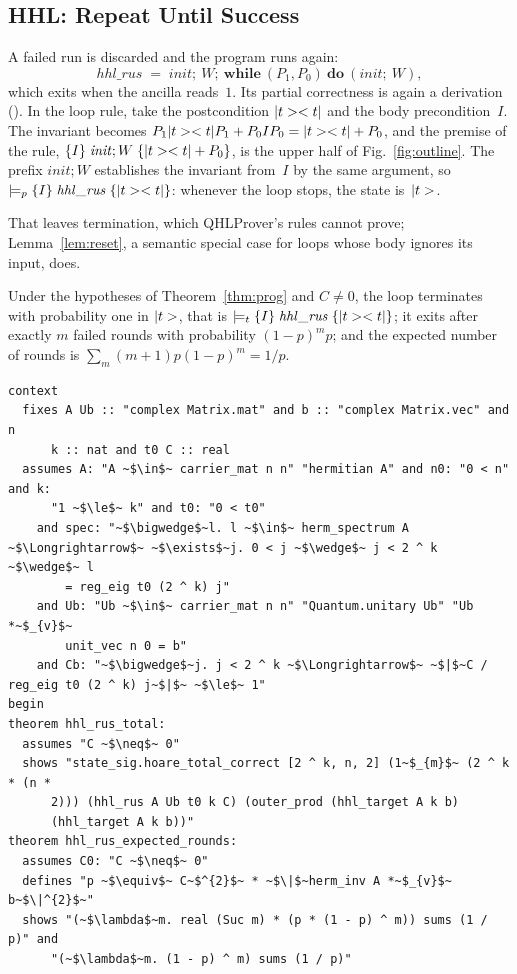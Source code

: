 \subsection{HHL: Repeat Until Success}

A failed run is discarded and the program runs again:
\[
\mathit{hhl\_rus}\;=\;\mathit{init};\ W;\ \mathbf{while}\ (P_1,P_0)\ \mathbf{do}\ (\mathit{init};\ W),
\]
which exits when the ancilla reads~$1$. Its partial correctness is again a derivation (). In the loop
rule, take the postcondition $|t>< t|$ and the body precondition~$I$. The invariant becomes
$P_1|t>< t|P_1+P_0IP_0=|t>< t|+P_0$, and the premise of the rule,
$\{I\}\;\mathit{init};W\;\{|t>< t|+P_0\}$, is the upper half of Fig.~\ref{fig:outline}. The prefix
$\mathit{init};W$ establishes the invariant from~$I$ by the same argument, so
$\models_{p}\{I\}\;\mathit{hhl\_rus}\;\{|t>< t|\}$: whenever the loop stops, the state is~$|t>$.

That leaves termination, which QHLProver's rules cannot prove; Lemma~\ref{lem:reset}, a semantic
special case for loops whose body ignores its input, does.

\begin{theorem}\label{thm:rus}
Under the hypotheses of Theorem~\ref{thm:prog} and $C\neq0$, the loop terminates with probability one
in $|t>$, that is $\models_{t}\{I\}\;\mathit{hhl\_rus}\;\{|t>< t|\}$; it exits after exactly $m$ failed
rounds with probability $(1-p)^mp$; and the expected number of rounds is
$\sum_m(m+1)p(1-p)^m=1/p$.
\end{theorem}

\begin{lstlisting}[float=tp,caption={Theorem~\ref{thm:rus}, the headline of the development, with the hypotheses of its context: \isa{spec} puts the spectrum on the grid, \isa{Ub} prepares $b$, and \isa{Cb} keeps the rotation angles admissible},label={lst:rus}]
context
  fixes A Ub :: "complex Matrix.mat" and b :: "complex Matrix.vec" and n
      k :: nat and t0 C :: real
  assumes A: "A ~$\in$~ carrier_mat n n" "hermitian A" and n0: "0 < n" and k:
      "1 ~$\le$~ k" and t0: "0 < t0"
    and spec: "~$\bigwedge$~l. l ~$\in$~ herm_spectrum A ~$\Longrightarrow$~ ~$\exists$~j. 0 < j ~$\wedge$~ j < 2 ^ k ~$\wedge$~ l
        = reg_eig t0 (2 ^ k) j"
    and Ub: "Ub ~$\in$~ carrier_mat n n" "Quantum.unitary Ub" "Ub *~$_{v}$~
        unit_vec n 0 = b"
    and Cb: "~$\bigwedge$~j. j < 2 ^ k ~$\Longrightarrow$~ ~$|$~C / reg_eig t0 (2 ^ k) j~$|$~ ~$\le$~ 1"
begin
theorem hhl_rus_total:
  assumes "C ~$\neq$~ 0"
  shows "state_sig.hoare_total_correct [2 ^ k, n, 2] (1~$_{m}$~ (2 ^ k * (n *
      2))) (hhl_rus A Ub t0 k C) (outer_prod (hhl_target A k b)
      (hhl_target A k b))"
theorem hhl_rus_expected_rounds:
  assumes C0: "C ~$\neq$~ 0"
  defines "p ~$\equiv$~ C~$^{2}$~ * ~$\|$~herm_inv A *~$_{v}$~ b~$\|^{2}$~"
  shows "(~$\lambda$~m. real (Suc m) * (p * (1 - p) ^ m)) sums (1 / p)" and
      "(~$\lambda$~m. (1 - p) ^ m) sums (1 / p)"
\end{lstlisting}

